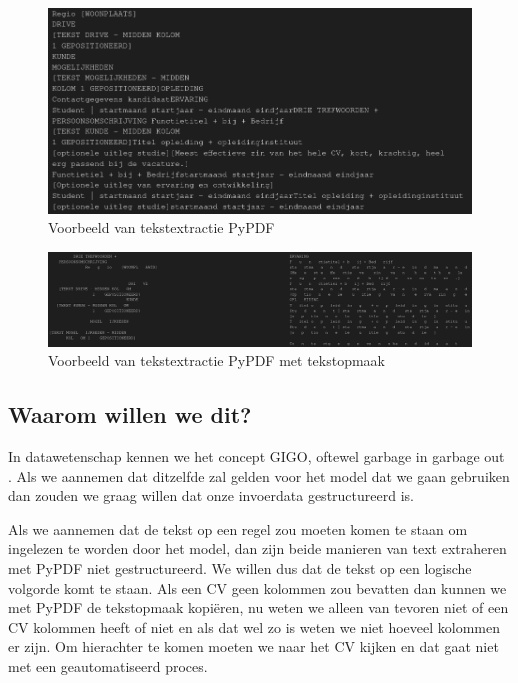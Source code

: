 \documentclass{article}
\begin{document}
\begin{figure}[ht]
    \begin{center}
        \includegraphics[width=\linewidth]{img/voorbeeld_pypdf_text_extract_geen_layout.png}
    \end{center}
    \caption{Voorbeeld van tekstextractie PyPDF}
    \label{fig:pypdf-no-layout}
\end{figure}

\begin{figure}[ht]
    \begin{center}
        \includegraphics[width=\linewidth]{img/voorbeeld_pypdf_text_extract_layout.png}
    \end{center}
    \caption{Voorbeeld van tekstextractie PyPDF met tekstopmaak}
    \label{fig:pypdf-w-layout}
\end{figure}

\vfill

\subsection{Waarom willen we dit?}

In datawetenschap kennen we het concept GIGO, oftewel garbage in garbage out
\cite{merriam-webster-no-date}. Als we aannemen dat ditzelfde zal gelden voor
het model dat we gaan gebruiken dan zouden we graag willen dat onze invoerdata
gestructureerd is.

Als we aannemen dat de tekst op een regel zou moeten komen te staan om ingelezen
te worden door het model, dan zijn beide manieren van text extraheren met PyPDF
niet gestructureerd. We willen dus dat de tekst op een logische volgorde komt te
staan. Als een CV geen kolommen zou bevatten dan kunnen we met PyPDF de
tekstopmaak kopiëren, nu weten we alleen van tevoren niet of een CV kolommen
heeft of niet en als dat wel zo is weten we niet hoeveel kolommen er zijn. Om
hierachter te komen moeten we naar het CV kijken en dat gaat niet met een
geautomatiseerd proces.
\end{document}
